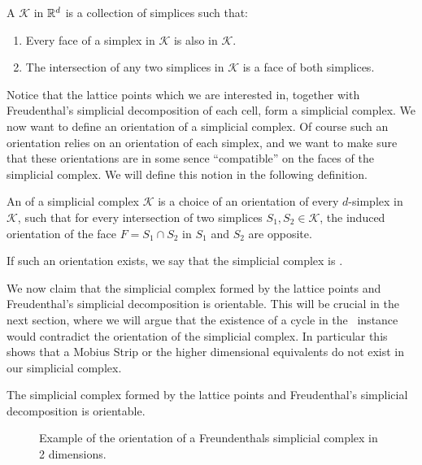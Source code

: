 \begin{definition}
    A  $\mathcal{K}$ in $\mathbb{R}^d$ is a collection of simplices such that:
    \begin{enumerate}
        \item Every face of a simplex in $\mathcal{K}$ is also in $\mathcal{K}$.
        \item The intersection of any two simplices in $\mathcal{K}$ is a face of both simplices.
    \end{enumerate}
\end{definition}

Notice that the lattice points which we are interested in, together with Freudenthal's simplicial decomposition of each cell, form a simplicial complex. We now want to define an orientation of a simplicial complex. Of course such an orientation relies on an orientation of each simplex, and we want to make sure that these orientations are in some sence ``compatible'' on the faces of the simplicial complex. We will define this notion in the following definition.

\begin{definition}
    An  of a simplicial complex $\mathcal{K}$ is a choice of an orientation of every $d$-simplex in $\mathcal{K}$, such that for every intersection of two simplices $S_1, S_2 \in \mathcal{K}$, the induced orientation of the face $F = S_1 \cap S_2$ in $S_1$ and $S_2$ are opposite. \par
    If such an orientation exists, we say that the simplicial complex is .
\end{definition}

We now claim that the simplicial complex formed by the lattice points and Freudenthal's simplicial decomposition is orientable. This will be crucial in the next section, where we will argue that the existence of a cycle in the \EndOfLine\ instance would contradict the orientation of the simplicial complex. In particular this shows that a Mobius Strip or the higher dimensional equivalents do not exist in our simplicial complex.

\begin{claim}
    The simplicial complex formed by the lattice points and Freudenthal's simplicial decomposition is orientable.
\end{claim}

\begin{figure}[h]
    \centering
    \caption[Orientation of a simplicial complex]{Example of the orientation of a Freundenthals simplicial complex in 2 dimensions.}
    \label{fig:orientation_of_simplicial_complex}
\end{figure}

